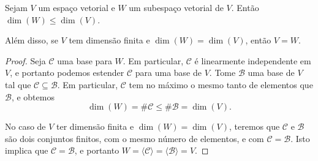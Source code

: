 \begin{theorem}
	Sejam $V$ um espaço vetorial e $W$ um subespaço vetorial de $V$. Então $\dim(W)\leq\dim(V)$.
	
	Além disso, se $V$ tem dimensão finita e $\dim(W)=\dim(V)$, então $V=W$.
\end{theorem}

\begin{proof}
	Seja $\mathcal{C}$ uma base para $W$. Em particular, $\mathcal{C}$ é linearmente independente em $V$, e portanto podemos estender $\mathcal{C}$ para uma base de $V$. Tome $\mathcal{B}$ uma base de $V$ tal que $\mathcal{C}\subseteq\mathcal{B}$. Em particular, $\mathcal{C}$ tem no máximo o mesmo tanto de elementos que $\mathcal{B}$, e obtemos
	\[\dim(W)=\#\mathcal{C}\leq\#\mathcal{B}=\dim(V).\]
	
	No caso de $V$ ter dimensão finita e $\dim(W)=\dim(V)$, teremos que $\mathcal{C}$ e $\mathcal{B}$ são dois conjuntos finitos, com o mesmo número de elementos, e com $\mathcal{C}=\mathcal{B}$. Isto implica que $\mathcal{C}=\mathcal{B}$, e portanto $W=\langle\mathcal{C}\rangle=\langle\mathcal{B}\rangle=V$.
\end{proof}